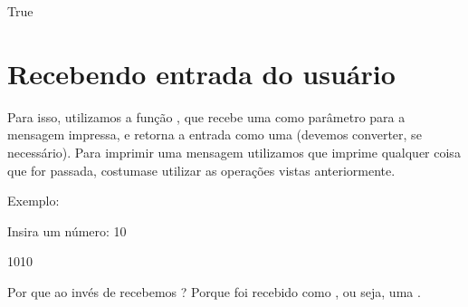 \documentclass[letterpaper,10pt,english]{jupyterBook}
\begin{document}
\begin{sphinxVerbatim}[commandchars=\\\{\}]
 
\end{sphinxVerbatim}

\begin{sphinxVerbatim}[commandchars=\\\{\}]
True
\end{sphinxVerbatim}


\section{Recebendo entrada do usuário}
\label{\detokenize{chapters/2:recebendo-entrada-do-usuario}}
\sphinxAtStartPar
Para isso, utilizamos a função , que recebe uma  como parâmetro para a mensagem impressa, e retorna a entrada como uma  (devemos converter, se necessário). Para imprimir uma mensagem utilizamos  que imprime qualquer coisa que for passada, costuma\sphinxhyphen{}se utilizar as operações vistas anteriormente.

\sphinxAtStartPar
Exemplo:

\begin{sphinxVerbatim}[commandchars=\\\{\}]
  
  
\end{sphinxVerbatim}

\begin{sphinxVerbatim}[commandchars=\\\{\}]
Insira um número:  10
\end{sphinxVerbatim}

\begin{sphinxVerbatim}[commandchars=\\\{\}]
\PYGZsq{}1010\PYGZsq{}
\end{sphinxVerbatim}

\sphinxAtStartPar
Por que ao invés de  recebemos ? Porque  foi recebido como , ou seja, uma .
\end{document}
